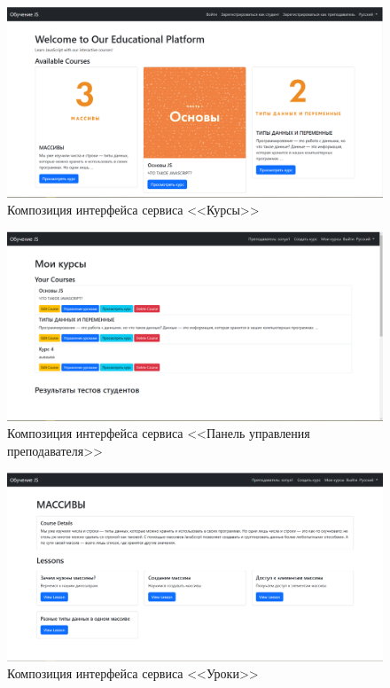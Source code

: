 \begin{figure}[ht]
	\centering
	\includegraphics[width=1\linewidth]{images/курсы}
	\caption{Композиция интерфейса сервиса <<Курсы>>}
	\label{templ:image1}
\end{figure}

\begin{figure}[ht]
	\centering
	\includegraphics[width=1\linewidth]{images/учитель}
	\caption{Композиция интерфейса сервиса <<Панель управления преподавателя>>}
	\label{templ:image2}
\end{figure}

\begin{figure}[ht]
	\centering
	\includegraphics[width=1\linewidth]{images/уроки}
	\caption{Композиция интерфейса сервиса <<Уроки>>}
	\label{templ:image3}
\end{figure}

